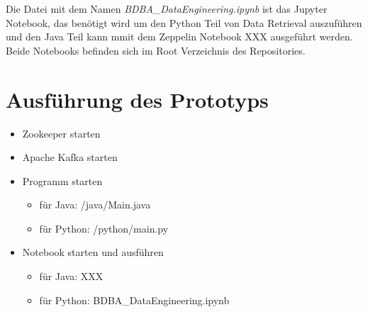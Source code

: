 Die Datei mit dem Namen \textit{BDBA\_DataEngineering.ipynb} ist das Jupyter Notebook, das benötigt wird um den Python Teil von Data Retrieval auszuführen
und den Java Teil kann mmit dem Zeppelin Notebook XXX ausgeführt werden.
Beide Notebooks befinden sich im Root Verzeichnis des Repositories.

\section{Ausführung des Prototyps}
\begin{itemize}
  \item Zookeeper starten
  \item Apache Kafka starten
  \item Programm starten
  \begin{itemize}
    \item für Java: /java/Main.java
    \item für Python: /python/main.py
  \end{itemize}
  \item Notebook starten und ausführen
  \begin{itemize}
    \item für Java: XXX
    \item für Python: BDBA\_DataEngineering.ipynb
  \end{itemize}
\end{itemize}
